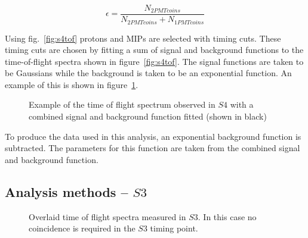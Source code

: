	\begin{equation}
		\epsilon = \frac{N_{2PMTcoins}}{N_{2PMTcoins}+N_{1PMTcoins}}
		\label{eq:barEff}
	\end{equation}
	
	Using fig.~\ref{fig:s4tof} protons and MIPs are selected with timing cuts. These timing cuts are chosen by fitting a sum of signal and background functions to the time-of-flight spectra shown in figure~\ref{fig:s4tof}. The signal functions are taken to be Gaussians while the background is taken to be an exponential function. An example of this is shown in figure~\ref{fig:fitEx}.
	
	\begin{figure}[h]
		\begin{adjustbox}{max totalsize={.7\textwidth}{.62\textheight},center}
			
		\end{adjustbox}
		\caption{Example of the time of flight spectrum observed in $S4$ with a combined signal and background function fitted (shown in black)}
		\label{fig:fitEx}
	\end{figure}

	To produce the data used in this analysis, an exponential background function is subtracted. The parameters for this function are taken from the combined signal and background function.
	
	\subsection{Analysis methods -- $S3$}
	
	
	\begin{figure}[h]
		\begin{adjustbox}{max totalsize={.8\textwidth}{.7\textheight},center}
			
		\end{adjustbox}
		\caption{Overlaid time of flight spectra measured in $S3$. In this case no coincidence is required in the $S3$ timing point.}
		\label{fig:s3tof_nos2}
	\end{figure}
	